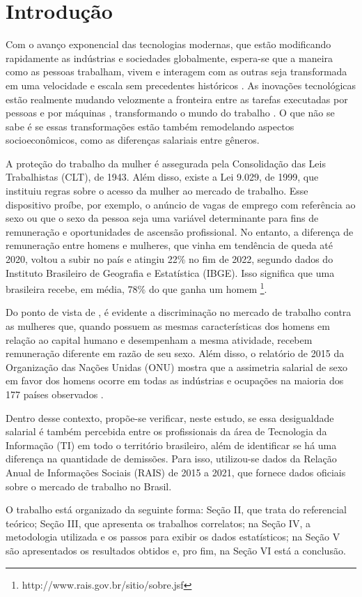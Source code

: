 \section{Introdução}

Com o avanço exponencial das tecnologias modernas, que estão modificando rapidamente as indústrias e sociedades globalmente, espera-se que a maneira como as pessoas trabalham, vivem e interagem com as outras seja transformada em uma velocidade e escala sem precedentes históricos \cite{hand1981artificial}. As inovações tecnológicas estão realmente mudando velozmente a fronteira entre as tarefas executadas por pessoas e por máquinas , transformando o mundo do trabalho \cite{aksoy2021robots}. O que não se sabe é se essas transformações estão também remodelando aspectos socioeconômicos, como as diferenças salariais entre gêneros.

A proteção do trabalho da mulher é assegurada pela Consolidação das Leis Trabalhistas (CLT), de 1943. Além disso, existe a Lei 9.029, de 1999, que instituiu regras sobre o acesso da mulher ao mercado de trabalho. Esse dispositivo proíbe, por exemplo, o anúncio de vagas de emprego com referência ao sexo ou que o sexo da pessoa seja uma variável determinante para fins de remuneração e oportunidades de ascensão profissional. No entanto, a diferença de remuneração entre homens e mulheres, que vinha em tendência de queda até 2020, voltou a subir no país e atingiu 22\% no fim de 2022, segundo dados do Instituto Brasileiro de Geografia e Estatística (IBGE). Isso significa que uma brasileira recebe, em média, 78\% do que ganha um homem \footnote{http://www.rais.gov.br/sitio/sobre.jsf}.

Do ponto de vista de \cite{ahmed2015human}, é evidente a discriminação no mercado de trabalho contra as mulheres que, quando possuem as mesmas características dos homens em relação ao capital humano e desempenham a mesma atividade, recebem remuneração diferente em razão de seu sexo. Além disso, o relatório de 2015 da Organização das Nações Unidas (ONU) mostra que a assimetria salarial de sexo em favor dos homens ocorre em todas as indústrias e ocupações na maioria dos 177 países observados \cite{report2015onu}.

Dentro desse contexto, propõe-se verificar, neste estudo, se essa desigualdade salarial é também percebida entre os profissionais da área de Tecnologia da Informação (TI) em todo o território brasileiro, além de identificar se há uma diferença na quantidade de demissões. Para isso, utilizou-se dados da Relação Anual de Informações Sociais (RAIS) de 2015 a 2021, que fornece dados oficiais sobre o mercado de trabalho no Brasil. 

O trabalho está organizado da seguinte forma: Seção II, que trata do referencial teórico; Seção III, que apresenta os trabalhos correlatos; na Seção IV, a metodologia utilizada e os passos para exibir os dados estatísticos; na Seção V são apresentados os resultados obtidos e, pro fim, na Seção VI está a conclusão.